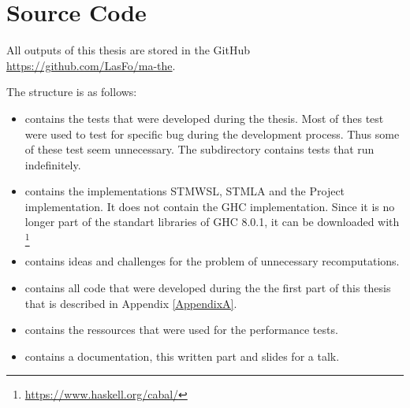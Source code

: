 
\chapter{Source Code} 
\label{AppendixC} 

All outputs of this thesis are stored in the GitHub \url{https://github.com/LasFo/ma-the}.

The structure is as follows:
\begin{itemize}
 \item {} contains the tests that were developed during the thesis. Most of thes test were
                    used to test for specific bug during the development process. Thus some of these
                    test seem unnecessary. The subdirectory contains
                    tests that run indefinitely. 
 \item {} contains the implementations STMWSL, STMLA and the Project implementation.
                             It does not contain the GHC implementation. Since it is no longer part of 
                             the standart libraries of GHC 8.0.1, it can be downloaded with \footnote{\url{https://www.haskell.org/cabal/}}
 \item {} contains ideas and challenges for the problem of unnecessary recomputations.
 \item {} contains all code that were developed during the the first part of this thesis that is described in Appendix \ref{AppendixA}.
 \item {} contains the ressources that were used for the performance tests.
 \item {} contains a documentation, this written part and slides for a talk.
\end{itemize}
